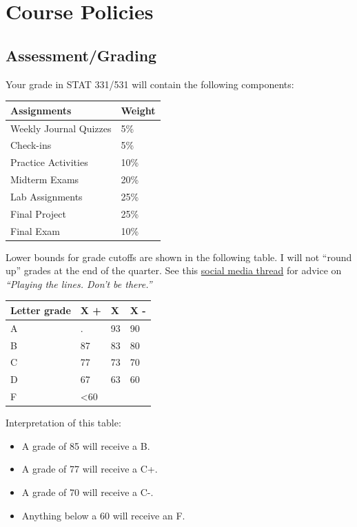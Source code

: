 \documentclass[
  11pt,
  letterpaper,
  DIV=11,
  numbers=noendperiod]{scrartcl}
\providecommand{\tightlist}{%
  \setlength{\itemsep}{0pt}\setlength{\parskip}{0pt}}\usepackage{longtable,booktabs,array}
\begin{document}
\hypertarget{course-policies}{%
\section{Course Policies}\label{course-policies}}

\hypertarget{assessmentgrading}{%
\subsection{Assessment/Grading}\label{assessmentgrading}}

Your grade in STAT 331/531 will contain the following components:

\begin{longtable}[]{@{}ll@{}}
\toprule\noalign{}
Assignments & Weight \\
\midrule\noalign{}
\endhead
\bottomrule\noalign{}
\endlastfoot
Weekly Journal Quizzes & 5\% \\
Check-ins & 5\% \\
Practice Activities & 10\% \\
Midterm Exams & 20\% \\
Lab Assignments & 25\% \\
Final Project & 25\% \\
Final Exam & 10\% \\
\end{longtable}

Lower bounds for grade cutoffs are shown in the following table. I will
not ``round up'' grades at the end of the quarter. See this
\href{https://twitter.com/drseanmullen/status/1604212304622518272?s=46\&t=II3oNLTSSrljVPqptoe21g}{social
media thread} for advice on \emph{``Playing the lines. Don't be
there.''}

\begin{longtable}[]{@{}llll@{}}
\toprule\noalign{}
Letter grade & X + & X & X - \\
\midrule\noalign{}
\endhead
\bottomrule\noalign{}
\endlastfoot
A & . & 93 & 90 \\
B & 87 & 83 & 80 \\
C & 77 & 73 & 70 \\
D & 67 & 63 & 60 \\
F & \textless60 & & \\
\end{longtable}

Interpretation of this table:

\begin{itemize}
\tightlist
\item
  A grade of 85 will receive a B.
\item
  A grade of 77 will receive a C+.
\item
  A grade of 70 will receive a C-.
\item
  Anything below a 60 will receive an F.
\end{itemize}
\end{document}
